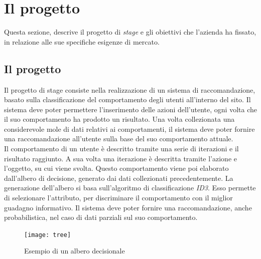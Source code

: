 \section{Il progetto}
Questa sezione, descrive il progetto di \emph{stage} e gli obiettivi che l'azienda ha fissato, in relazione alle sue specifiche esigenze di mercato. 
\subsection{Il progetto}
Il progetto di stage consiste nella realizzazione di un sistema di raccomandazione, basato sulla classificazione del comportamento degli utenti all'interno del sito. Il sistema deve poter permettere l'inserimento delle azioni dell'utente, ogni volta che il suo comportamento ha prodotto un risultato. Una volta collezionata una considerevole mole di dati relativi ai comportamenti, il sistema deve poter fornire una raccomandazione all'utente sulla base del suo comportamento attuale.\\ Il comportamento di un utente è descritto tramite una serie di iterazioni e il risultato raggiunto. A sua volta una iterazione è descritta tramite l'azione e l'oggetto, su cui viene svolta. Questo comportamento viene poi elaborato dall'albero di decisione, generato dai dati collezionati precedentemente. La generazione dell'albero si basa sull'algoritmo di classificazione \emph{ID3}. Esso permette di selezionare l'attributo, per discriminare il comportamento con il miglior guadagno informativo. Il sistema deve poter fornire una raccomandazione, anche probabilistica, nel caso di dati parziali sul suo comportamento.
\begin{figure}[ht]
\centering
\texttt{[image: tree]}
\caption{Esempio di un albero decisionale}
\end{figure}
